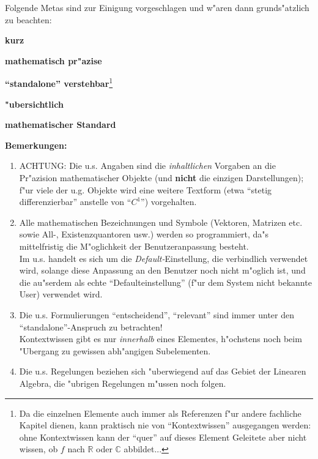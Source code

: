 Folgende Metas sind zur Einigung vorgeschlagen und w"aren dann grunds"atzlich zu beachten:

\begin{list_sabina}
\item
\textbf{kurz}
\item
\textbf{mathematisch pr"azise}
\item
\textbf{``standalone'' verstehbar}\footnote{Da die einzelnen Elemente 
auch immer als Referenzen f"ur andere fachliche Kapitel dienen, kann praktisch nie
von ``Kontextwissen'' ausgegangen werden: ohne Kontextwissen kann der ``quer'' auf dieses
Element Geleitete aber nicht wissen, ob $f$ nach $\mathbb{R}$
oder $\mathbb{C}$ abbildet...}
\item
\textbf{"ubersichtlich} 
\item
\textbf{mathematischer Standard} 
\end{list_sabina}

\vspace{5mm}

\textbf{Bemerkungen:} 

\begin{enumerate}
\item
ACHTUNG: Die u.s. Angaben sind die \textit{inhaltlichen} Vorgaben an
die Pr"azision mathematischer Objekte (und \textbf{nicht} die einzigen
Darstellungen); f"ur viele der u.g. Objekte wird eine weitere Textform
(etwa ``stetig differenzierbar'' anstelle von ``$C^{1}$'')
vorgehalten.
\item
Alle mathematischen Bezeichnungen und Symbole
(Vektoren, Matrizen etc. sowie All-, Existenzquantoren usw.) werden so
programmiert, da"s mittelfristig die M"oglichkeit der
Benutzeranpassung besteht.\\
Im u.s. handelt es sich um die \textit{Default-}Einstellung, die
verbindlich verwendet wird, solange diese Anpassung an den Benutzer
noch nicht m"oglich ist, und die au"serdem als echte 
``Defaulteinstellung'' (f"ur dem System nicht bekannte User) verwendet wird.
\item
Die u.s. Formulierungen ``entscheidend'', ``relevant'' sind immer unter
den ``standalone''-Anspruch zu betrachten!\\
Kontextwissen gibt es nur \textit{innerhalb} eines Elementes, 
h"ochstens noch beim "Ubergang zu gewissen abh"angigen Subelementen.
\item
Die u.s. Regelungen beziehen sich "uberwiegend auf das Gebiet der
Linearen Algebra, die "ubrigen Regelungen m"ussen noch folgen.
\end{enumerate}



